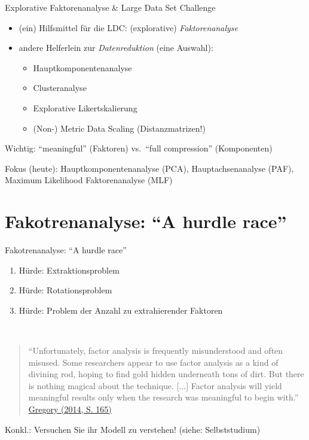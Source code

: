 \documentclass[
  ignorenonframetext,
]{beamer}
\providecommand{\tightlist}{%
  \setlength{\itemsep}{0pt}\setlength{\parskip}{0pt}}
\begin{document}
\begin{frame}{Explorative Faktorenanalyse \& Large Data Set Challenge}
\protect\hypertarget{explorative-faktorenanalyse-large-data-set-challenge}{}
\begin{itemize}
\tightlist
\item
  (ein) Hilfsmittel für die LDC: (explorative) \emph{Faktorenanalyse}
\end{itemize}

\begin{itemize}
\item
  andere Helferlein zur \emph{Datenreduktion} (eine Auswahl):

  \begin{itemize}
  \tightlist
  \item
    Hauptkomponentenanalyse
  \item
    Clusteranalyse
  \item
    Explorative Likertskalierung
  \item
    (Non-) Metric Data Scaling (Distanzmatrizen!)
  \end{itemize}
\end{itemize}

Wichtig: ``meaningful'' (Faktoren) vs.~``full compression''
(Komponenten)

Fokus (heute): Hauptkomponentenanalyse (PCA), Hauptachsenanalyse (PAF),
Maximum Likelihood Faktorenanalyse (MLF)
\end{frame}

\hypertarget{fakotrenanalyse-a-hurdle-race}{%
\section{Fakotrenanalyse: ``A hurdle
race''}\label{fakotrenanalyse-a-hurdle-race}}

\begin{frame}{Fakotrenanalyse: ``A hurdle race''}
\begin{enumerate}
\tightlist
\item
  Hürde: Extraktionsproblem
\item
  Hürde: Rotationsproblem
\item
  Hürde: Problem der Anzahl zu extrahierender Faktoren
\end{enumerate}

~

\begin{quote}
``Unfortunately, factor analysis is frequently misunderstood and often
misused. Some researchers appear to use factor analysis as a kind of
divining rod, hoping to find gold hidden underneath tons of dirt. But
there is nothing magical about the technique. {[}\(\dots\){]} Factor
analysis will yield meaningful results only when the research was
meaningful to begin with.''
\href{https://www.pearson.com/us/higher-education/program/Gregory-Psychological-Testing-History-Principles-and-Applications-7th-Edition/PGM332874.html}{Gregory
(2014, S. 165)}
\end{quote}

Konkl.: Versuchen Sie ihr Modell zu verstehen! (siehe: Selbststudium)
\end{frame}
\end{document}
